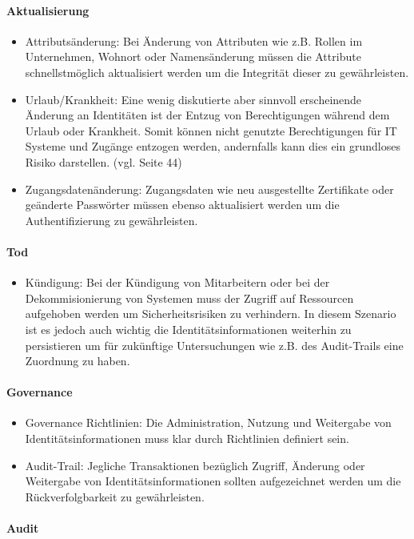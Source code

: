 \documentclass[11pt]{article}
\begin{document}
\paragraph{Aktualisierung}
\begin{itemize}
  \item Attributsänderung: Bei Änderung von Attributen wie z.B. Rollen im Unternehmen, Wohnort oder Namensänderung müssen die Attribute schnellstmöglich aktualisiert werden um die Integrität dieser zu gewährleisten.
  \item Urlaub/Krankheit: Eine wenig diskutierte aber sinnvoll erscheinende Änderung an Identitäten ist der Entzug von Berechtigungen während dem Urlaub oder Krankheit. Somit können nicht genutzte Berechtigungen für IT Systeme und Zugänge entzogen werden, andernfalls kann dies ein grundloses Risiko darstellen. (vgl. \cite{tsolkas2017} Seite 44)
  \item Zugangsdatenänderung: Zugangsdaten wie neu ausgestellte Zertifikate oder geänderte Passwörter müssen ebenso aktualisiert werden um die Authentifizierung zu gewährleisten.
\end{itemize}
\paragraph{Tod}
\begin{itemize}
  \item Kündigung: Bei der Kündigung von Mitarbeitern oder bei der Dekommisionierung von Systemen muss der Zugriff auf Ressourcen aufgehoben werden um Sicherheitsrisiken zu verhindern. In diesem Szenario ist es jedoch auch wichtig die Identitätsinformationen weiterhin zu persistieren um für zukünftige Untersuchungen wie z.B. des Audit-Trails eine Zuordnung zu haben.
\end{itemize}
\paragraph{Governance}
\begin{itemize}
  \item Governance Richtlinien: Die Administration, Nutzung und Weitergabe von Identitätsinformationen muss klar durch Richtlinien definiert sein.
  \item Audit-Trail: Jegliche Transaktionen bezüglich Zugriff, Änderung oder Weitergabe von Identitätsinformationen sollten aufgezeichnet werden um die Rückverfolgbarkeit zu gewährleisten.
\end{itemize}
\paragraph{Audit}
\end{document}
